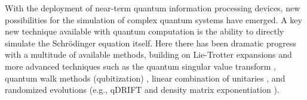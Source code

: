 \documentclass[12pt,oneside]{amsart}
\theoremstyle{plain}%
\theoremstyle{definition}
\theoremstyle{remark}
\begin{document}
With the deployment of near-term quantum information processing devices, new possibilities for the simulation of complex quantum systems have emerged. A key new technique available with quantum computation is the ability to directly simulate the Schrödinger equation itself. Here there has been dramatic progress with a multitude of available methods, building on Lie-Trotter expansions \cite{zalkaSimulatingQuantumSystems1998,childsTheoryTrotterError2021,lowComplexityImplementingTrotter2022} and more advanced techniques such as the quantum singular value transform \cite{gilyenQuantumSingularValue2019,martynGrandUnificationQuantum2021}, quantum walk methods (qubitization) \cite{lowHamiltonianSimulationQubitization2019,lowOptimalHamiltonianSimulation2017}, linear combination of unitaries \cite{childsHamiltonianSimulationUsing}, and randomized evolutions (e.g., qDRIFT \cite{campbellRandomCompilerFast2019} and density matrix exponentiation \cite{lloydQuantumPrincipalComponent2014a}). 



\end{document}
